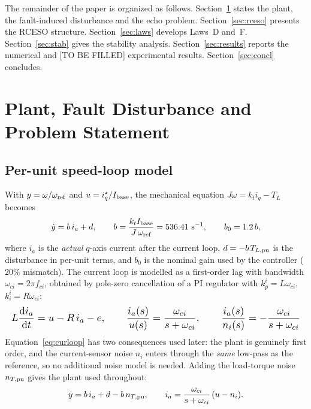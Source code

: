 \documentclass[journal]{IEEEtran}
\theoremstyle{remark}
\begin{document}
The remainder of the paper is organized as follows. Section~\ref{sec:plant} states
the plant, the fault-induced disturbance and the echo problem.
Section~\ref{sec:rceso} presents the RCESO structure. Section~\ref{sec:laws}
develops Laws~D and~F. Section~\ref{sec:stab} gives the stability analysis.
Section~\ref{sec:results} reports the numerical and [TO BE FILLED] experimental
results. Section~\ref{sec:concl} concludes.

\section{Plant, Fault Disturbance and Problem Statement}\label{sec:plant}

\subsection{Per-unit speed-loop model}
With $y=\omega/\omega_{\rm ref}$ and $u=i_q^\star/I_{\rm base}$, the mechanical
equation $J\dot\omega=k_t i_q-T_L$ becomes
\begin{equation}
\dot y=b\,i_a+d,\qquad
b=\frac{k_t I_{\rm base}}{J\,\omega_{\rm ref}}=536.41~\mathrm{s^{-1}},
\qquad b_0=1.2\,b ,
\label{eq:obj}
\end{equation}
where $i_a$ is the \emph{actual} $q$-axis current after the current loop, $d=-b\,T_{L,\rm pu}$
is the disturbance in per-unit terms, and $b_0$ is the nominal gain used by the
controller ($20\%$ mismatch). The current loop is modelled as a first-order lag with
bandwidth $\omega_{ci}=2\pi f_{ci}$, obtained by pole-zero cancellation of a PI
regulator with $k_p^i=L\omega_{ci}$, $k_i^i=R\omega_{ci}$:
\begin{equation}
\resizebox{\columnwidth}{!}{$\displaystyle
L\frac{\mathrm d i_a}{\mathrm dt}=u-R\,i_a-e,\qquad
\frac{i_a(s)}{u(s)}=\frac{\omega_{ci}}{s+\omega_{ci}},\qquad
\frac{i_a(s)}{n_i(s)}=-\frac{\omega_{ci}}{s+\omega_{ci}}$}
\label{eq:curloop}
\end{equation}
Equation~\eqref{eq:curloop} has two consequences used later: the plant is genuinely
first order, and the current-sensor noise $n_i$ enters through the \emph{same}
low-pass as the reference, so no additional noise model is needed. Adding the
load-torque noise $n_{T,\rm pu}$ gives the plant used throughout:
\begin{equation}
\dot y=b\,i_a+d-b\,n_{T,\rm pu},\qquad
i_a=\frac{\omega_{ci}}{s+\omega_{ci}}\,(u-n_i).
\label{eq:plant}
\end{equation}
\end{document}
